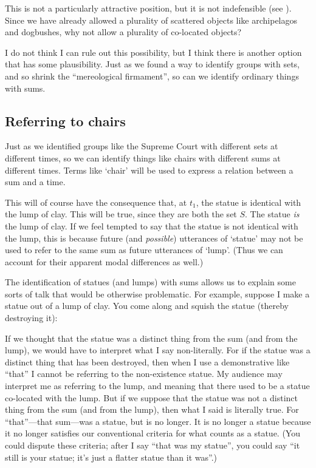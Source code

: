 \documentclass[11pt]{article}
\begin{document}
\begin{spacing}{1.5}
This is not a particularly attractive position, but it is not
indefensible (see \citet{bennett2004}).  Since we have already allowed
a plurality of scattered objects like archipelagos and dogbushes, why
not allow a plurality of co-located objects?

I do not think I can rule out this possibility, but I think there is
another option that has some plausibility.  Just as we found a way to
identify groups with sets, and so shrink the ``mereological
firmament'', so can we identify ordinary things with sums.

\subsection{Referring to chairs}
\label{chair-ref}
Just as we identified groups like the Supreme Court with different
sets at different times, so we can identify things like chairs with
different sums at different times.  Terms like `chair' will be used to
express a relation between a sum and a time.

This will of course have the consequence that, at $t_1$, the statue is
identical with the lump of clay.  This will be true, since they are
both the set $S$.  The statue {\em is} the lump of clay.  If we feel
tempted to say that the statue is not identical with the lump, this is
because future (and {\em possible}) utterances of `statue' may not be
used to refer to the same sum as future utterances of `lump'.  (Thus
we can account for their apparent modal differences as well.)

The identification of statues (and lumps) with sums allows us to
explain some sorts of talk that would be otherwise problematic.  For
example, suppose I make a statue out of a lump of clay.  You come
along and squish the statue (thereby destroying it):


If we thought that the statue was a distinct thing from the sum (and
from the lump), we would have to interpret what I say non-literally.
For if the statue was a distinct thing that has been destroyed, then
when I use a demonstrative like ``that'' I cannot be referring to the
non-existence statue.  My audience may interpret me as referring to
the lump, and meaning that there used to be a statue co-located with
the lump.  But if we suppose that the statue was not a distinct thing
from the sum (and from the lump), then what I said is literally true.
For ``that''---that sum---was a statue, but is no longer.  It is no
longer a statue because it no longer satisfies our conventional
criteria for what counts as a statue.  (You could dispute these
criteria; after I say ``that was my statue'', you could say ``it still
is your statue; it's just a flatter statue than it was''.)


\end{spacing}
\end{document}
